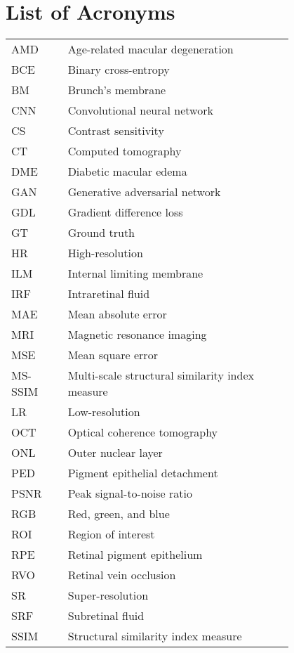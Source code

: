 \chapter*{List of Acronyms}

\begin{flushleft}
\begin{tabular}{l p{0.8\linewidth}}
	
AMD      & Age-related macular degeneration\\
BCE		 & Binary cross-entropy\\
BM   	 & Brunch's membrane\\
CNN      & Convolutional neural network\\
CS 		 & Contrast sensitivity\\
CT 		 & Computed tomography\\
DME      & Diabetic macular edema\\
GAN 	 & Generative adversarial network\\
GDL 	 & Gradient difference loss\\
GT  	 & Ground truth\\
HR 		 & High-resolution\\
ILM 	 & Internal limiting membrane\\
IRF      & Intraretinal fluid\\
MAE 	 & Mean absolute error\\
MRI 	 & Magnetic resonance imaging\\
MSE		 & Mean square error\\	
MS-SSIM  & Multi-scale structural similarity index measure\\
LR 		 & Low-resolution\\
OCT      & Optical coherence tomography\\
ONL      & Outer nuclear layer\\
PED      & Pigment epithelial detachment\\
PSNR 	 & Peak signal-to-noise ratio\\
RGB 	 & Red, green, and blue\\
ROI		 & Region of interest\\
RPE      & Retinal pigment epithelium\\
RVO 	 & Retinal vein occlusion\\
SR		 & Super-resolution\\
SRF      & Subretinal fluid\\
SSIM 	 & Structural similarity index measure\\

\end{tabular}
\end{flushleft}

